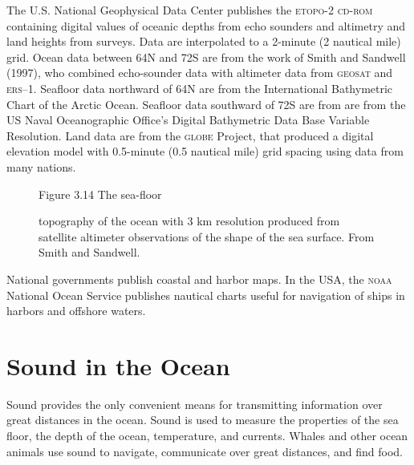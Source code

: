 The U.S. National Geophysical Data Center publishes the \textsc{etopo-2 cd-rom} containing
digital values of oceanic depths from echo sounders and altimetry and
land heights from surveys. Data are interpolated to a 2-minute (2
nautical mile) grid. Ocean data between 64\degrees N and 72\degrees S
are from the work of Smith and Sandwell (1997), who combined
echo-sounder data with altimeter data from \textsc{geosat} and
\textsc{ers--1}. Seafloor data northward of 64\degrees N are from the
International Bathymetric Chart of the Arctic Ocean.  Seafloor data
southward of 72\degrees S are from are from the US Naval Oceanographic
Office's Digital Bathymetric Data Base Variable Resolution. Land data
are from the \textsc{globe} Project, that produced a digital elevation
model with 0.5-minute (0.5 nautical mile) grid spacing using data from
many nations.

\begin{figure}[t!]
\centering
\footnotesize
Figure 3.14 The sea-floor \rule{0pt}{3ex}topography of the ocean with
3 km resolution produced from satellite altimeter observations of the
shape of the sea surface. From Smith and Sandwell.

\label{fig:worlsbathym}
\vspace{-4ex}
\end{figure}

National governments publish coastal and harbor maps. In the USA, the
\textsc{noaa} National Ocean Service publishes nautical charts useful
for navigation of ships in harbors and offshore waters.

\section{Sound in the Ocean}
Sound provides the only convenient means for
transmitting information over great distances in the ocean.
Sound is used to measure the properties of the sea
floor, the depth of the ocean, temperature, and currents. Whales and
other ocean animals use sound to navigate, communicate over great
distances, and find food.

